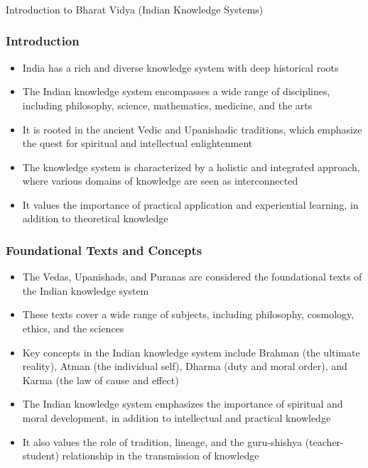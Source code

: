 \begin{frame}[fragile]\frametitle{}
\begin{center}
{\Large Introduction to Bharat Vidya (Indian Knowledge Systems)}
\end{center}
\end{frame}

\begin{frame}[fragile]\frametitle{Introduction}

\begin{itemize}
    \item India has a rich and diverse knowledge system with deep historical roots
    \item The Indian knowledge system encompasses a wide range of disciplines, including philosophy, science, mathematics, medicine, and the arts
    \item It is rooted in the ancient Vedic and Upanishadic traditions, which emphasize the quest for spiritual and intellectual enlightenment
    \item The knowledge system is characterized by a holistic and integrated approach, where various domains of knowledge are seen as interconnected
    \item It values the importance of practical application and experiential learning, in addition to theoretical knowledge
\end{itemize}

\end{frame}

\begin{frame}[fragile]\frametitle{Foundational Texts and Concepts}

\begin{itemize}
    \item The Vedas, Upanishads, and Puranas are considered the foundational texts of the Indian knowledge system
    \item These texts cover a wide range of subjects, including philosophy, cosmology, ethics, and the sciences
    \item Key concepts in the Indian knowledge system include Brahman (the ultimate reality), Atman (the individual self), Dharma (duty and moral order), and Karma (the law of cause and effect)
    \item The Indian knowledge system emphasizes the importance of spiritual and moral development, in addition to intellectual and practical knowledge
    \item It also values the role of tradition, lineage, and the guru-shishya (teacher-student) relationship in the transmission of knowledge
\end{itemize}

\end{frame}

